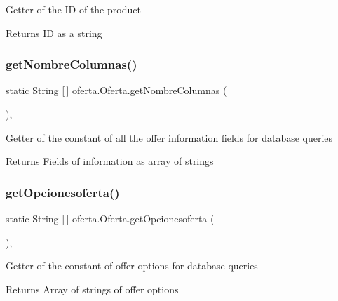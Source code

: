 Getter of the ID of the product

\begin{DoxyReturn}{Returns}
ID as a string 
\end{DoxyReturn}
\mbox{\label{classoferta_1_1_oferta_ab75e7ee84db370fdb8f5fcb4ea63e405}} 
\subsubsection{\texorpdfstring{get\+Nombre\+Columnas()}{getNombreColumnas()}}
{\footnotesize\ttfamily static String \mbox{[}$\,$\mbox{]} oferta.\+Oferta.\+get\+Nombre\+Columnas (\begin{DoxyParamCaption}{ }\end{DoxyParamCaption})\hspace{0.3cm}{\ttfamily [inline]}, {\ttfamily [static]}}

Getter of the constant of all the offer information fields for database queries

\begin{DoxyReturn}{Returns}
Fields of information as array of strings 
\end{DoxyReturn}
\mbox{\label{classoferta_1_1_oferta_a7c159e3fdec5eedb27c557e82611a67e}} 
\subsubsection{\texorpdfstring{get\+Opcionesoferta()}{getOpcionesoferta()}}
{\footnotesize\ttfamily static String \mbox{[}$\,$\mbox{]} oferta.\+Oferta.\+get\+Opcionesoferta (\begin{DoxyParamCaption}{ }\end{DoxyParamCaption})\hspace{0.3cm}{\ttfamily [inline]}, {\ttfamily [static]}}

Getter of the constant of offer options for database queries

\begin{DoxyReturn}{Returns}
Array of strings of offer options 
\end{DoxyReturn}
\mbox{\label{classoferta_1_1_oferta_a57a753a0bc4b862e6ea347320b25540e}} 
